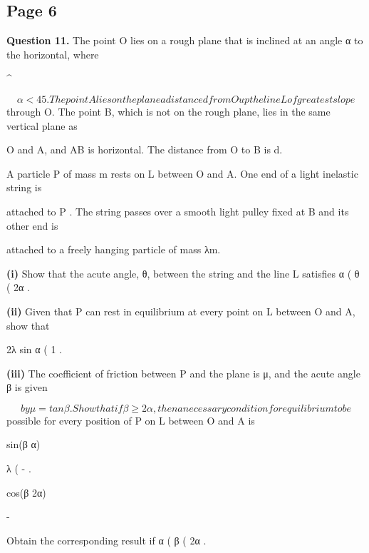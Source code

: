 \documentclass[12pt]{article}
\begin{document}
\subsection*{Page 6}
\begin{flushleft}
\bigskip\textbf{Question 11.} The point O lies on a rough plane that is inclined at an angle α to the horizontal, where\par
\textasciicircum{}\circ\par
\[α < 45 . The point A lies on the plane a distance d from O up the line L of greatest slope\]
through O. The point B, which is not on the rough plane, lies in the same vertical plane as\par
O and A, and AB is horizontal. The distance from O to B is d.\par
A particle P of mass m rests on L between O and A. One end of a light inelastic string is\par
attached to P . The string passes over a smooth light pulley fixed at B and its other end is\par
attached to a freely hanging particle of mass λm.\par
\textbf{(i)} Show that the acute angle, θ, between the string and the line L satisfies α ( θ ( 2α .\par
\textbf{(ii)} Given that P can rest in equilibrium at every point on L between O and A, show that\par
2λ sin α ( 1 .\par
\textbf{(iii)} The coefficient of friction between P and the plane is μ, and the acute angle β is given\par
\[by μ = tan β . Show that if β \geq 2α , then a necessary condition for equilibrium to be\]
possible for every position of P on L between O and A is\par
sin(β α)\par
λ ( - .\par
cos(β 2α)\par
-\par
Obtain the corresponding result if α ( β ( 2α .\par
\end{flushleft}
\end{document}
